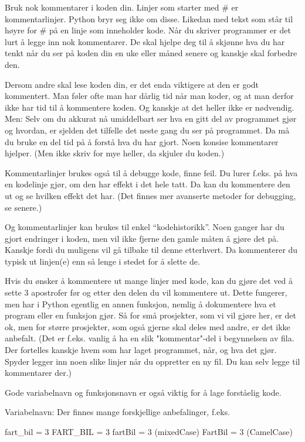 Bruk nok kommentarer i koden din. Linjer som starter med \# er kommentarlinjer. Python bryr seg ikke om disse. Likedan med tekst som står til høyre for \# på en linje som inneholder kode. Når du skriver programmer er det lurt å legge inn nok kommentarer. De skal hjelpe deg til å skjønne hva du har tenkt når du ser på koden din en uke eller måned senere og kanskje skal forbedre den.

Dersom andre skal lese koden din, er det enda viktigere at den er godt kommentert. Man føler ofte man har dårlig tid når man koder, og at man derfor ikke har tid til å kommentere koden. Og kanskje at det heller ikke er nødvendig. Men: Selv om du akkurat nå umiddelbart ser hva en gitt del av programmet gjør og hvordan, er sjelden det tilfelle det neste gang du ser på programmet. Da må du bruke en del tid på å forstå hva du har gjort. Noen konsise kommentarer hjelper. (Men ikke skriv for mye heller, da skjuler du koden.) 

Kommentarlinjer brukes også til å debugge kode, finne feil. Du lurer f.eks. på hva en kodelinje gjør, om den har effekt i det hele tatt. Da kan du kommentere den ut og se hvilken effekt det har. (Det finnes mer avanserte metoder for debugging, se senere.)

Og kommentarlinjer kan brukes til enkel ``kodehistorikk''. Noen ganger har du gjort endringer i koden, men vil ikke fjerne den gamle måten å gjøre det på. Kanskje fordi du muligens vil gå tilbake til denne etterhvert. Da kommenterer du typisk ut linjen(e) enn så lenge i stedet for å slette de.

Hvis du ønsker å kommentere ut mange linjer med kode, kan du gjøre det ved å sette 3 apostrofer før og etter den delen du vil kommentere ut. Dette fungerer, men har i Python egentlig en annen funksjon, nemlig å dokumentere hva et program eller en funksjon gjør. Så for små prosjekter, som vi vil gjøre her, er det ok, men for større prosjekter, som også gjerne skal deles med andre, er det ikke anbefalt.  (Det er f.eks. vanlig å ha en slik "kommentar"-del i begynnelsen av fila. Der fortelles kanskje hvem som har laget programmet, når, og hva det gjør. Spyder legger inn noen slike linjer når du oppretter en ny fil. Du kan selv legge til kommentarer der.) 

Gode variabelnavn og funksjonsnavn er også viktig for å lage forståelig kode.

Variabelnavn: 
Der finnes mange forskjellige anbefalinger, f.eks.
\begin{usncodebox}
fart_bil = 3
FART_BIL = 3
fartBil = 3 (mixedCase)
FartBil = 3 (CamelCase)
\end{usncodebox}

